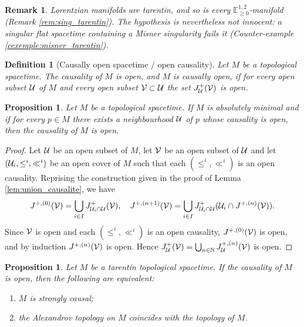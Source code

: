 \documentclass[a4paper,twoside]{article}
\newcommand{\mass}[1]{\mathbb{E}^{1,2}_{#1}}
\newtheorem{prop}[lem]{Proposition}
\newtheorem{defi}[lem]{Definition}
\newtheorem{rem}[lem]{Remark}
\begin{document}
\begin{rem}\label{rem:tarentin_exemples}
Lorentzian manifolds are tarentin, and so is every $\mass{\geq0}$-manifold (Remark
\ref{rem:sing_tarentin}). The hypothesis is nevertheless not innocent: a singular flat spacetime
containing a Misner singularity fails it (Counter-example \ref{cexemple:misner_tarentin}).
\end{rem}

\begin{defi}[Causally open spacetime / open causality]
Let $M$ be a topological spacetime. The causality of $M$ is open, and $M$ is causally open, if for every open subset $\mathcal{U}$ of $M$
and every open subset $\mathcal V\subset \mathcal{U}$ the set $J^+_{\mathcal{U}}(\mathcal V)$ is open.
\end{defi}
\begin{prop}Let $M$ be a topological spacetime. If $M$ is absolutely minimal and if for every $p\in M$ there
exists a neighbourhood $\mathcal{U}$ of $p$ whose causality is open, then
the causality of $M$ is open.
\end{prop}
\begin{proof}
Let $\mathcal{U}$ be an open subset of $M$,
let $\mathcal V$ be an open subset of $\mathcal{U}$ and let $(\mathcal{U}_i,\leq^i,\ll^i)$ be an open cover of $M$
such that each $(\leq^i,\ll^i)$ is an open causality.
Reprising the construction given in the proof
of Lemma \ref{lem:union_causalite}, we have
$$J^{+,(0)}(\mathcal V)= \bigcup_{i\in I} J^+_{\mathcal{U}_i\cap \mathcal{U}}(\mathcal V), \quad J^{+,(n+1)}(\mathcal V)=\bigcup_{i\in I} J^+_{\mathcal{U}_i\cap \mathcal{U}}(\mathcal{U}_i\cap J^{+,(n)}(\mathcal V)).$$
Since $\mathcal V$ is open and each $(\leq^i,\ll^i)$ is an open causality, $J^{+,(0)}(\mathcal V)$ is open, and by induction $J^{+,(n)}(\mathcal V)$
is open. Hence $J^+_{\mathcal{U}}(\mathcal V)=\bigcup_{n\in \mathbb{N}} J^{+,(n)}_{\mathcal{U}}(\mathcal V)$ is open.
\end{proof}

\begin{prop} Let $M$ be a tarentin topological spacetime. If the causality of $M$ is open, then the following are equivalent:
\begin{enumerate}[label=(\roman*)]
\item $M$ is strongly causal;
\item the Alexandrov topology on $M$ coincides with the topology of $M$.
\end{enumerate}
\end{prop}
\end{document}
